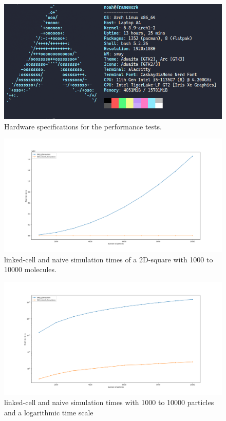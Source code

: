 \documentclass{article}
\begin{document}
\FloatBarrier

\begin{figure}[H]
    \includegraphics[width=\textwidth]{res/neofetch}
    \caption{Hardware specifications for the performance tests.}
    \label{fig:specs}
\end{figure}

\begin{figure}[H]
    \includegraphics[width=\textwidth]{res/lj_big_plot_linear}
    \caption{linked-cell and naive simulation times of a 2D-square with 1000 to 10000 molecules.}
    \label{fig:timelc}
\end{figure}

\begin{figure}[H]
    \includegraphics[width=\textwidth]{res/lj_big_plot_log}
    \caption{linked-cell and naive simulation times with 1000 to 10000 particles and a logarithmic time scale}
    \label{fig:timelclong}
\end{figure}
\end{document}
